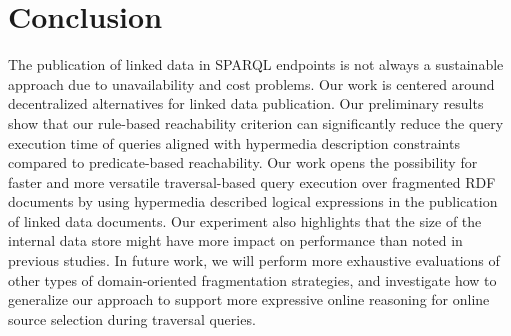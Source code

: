 \section{Conclusion}

The publication of linked data in SPARQL endpoints is not always a sustainable approach due to unavailability and cost problems.
Our work is centered around decentralized alternatives for linked data publication.
Our preliminary results show that our rule-based reachability criterion can significantly reduce the query execution time of queries aligned with hypermedia description constraints compared to predicate-based reachability.
Our work opens the possibility for faster and more versatile traversal-based query execution over fragmented RDF documents by using hypermedia described logical expressions in the publication of linked data documents.
Our experiment also highlights that the size of the internal data store might have more impact on performance than noted in previous studies.
In future work, we will perform more exhaustive evaluations of other types of domain-oriented fragmentation strategies,
and investigate how to generalize our approach to support more expressive online reasoning for online source selection during traversal queries.

